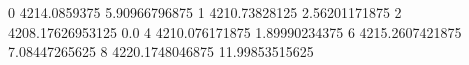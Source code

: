 0 4214.0859375 5.90966796875
1 4210.73828125 2.56201171875
2 4208.17626953125 0.0
4 4210.076171875 1.89990234375
6 4215.2607421875 7.08447265625
8 4220.1748046875 11.99853515625
